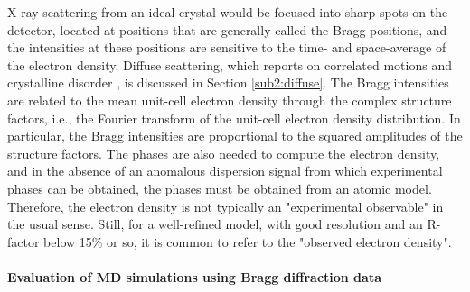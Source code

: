 \documentclass[9pt,review,pubversion]{livecoms}
\begin{document}
X-ray scattering from an ideal crystal would be focused into sharp spots on the detector, located at positions that are generally called the Bragg positions, and the intensities at these positions are sensitive to the time- and space-average of the electron density.
Diffuse scattering, which reports on correlated motions and crystalline disorder \cite{meisburger_x-ray_2017}, is discussed in Section \ref{sub2:diffuse}.
The Bragg intensities are related to the mean unit-cell electron density through the complex structure factors, i.e., the Fourier transform of the unit-cell electron density distribution.
In particular, the Bragg intensities are proportional to the squared amplitudes of the structure factors.
The phases are also needed to compute the electron density, and in the absence of an anomalous dispersion signal from which experimental phases can be obtained, the phases must be obtained from an atomic model.
Therefore, the electron density is not typically an "experimental observable" in the usual sense.
Still, for a well-refined model, with good resolution and an R-factor below 15\% or so, it is common to refer to the "observed electron density".

\paragraph{Evaluation of MD simulations using Bragg diffraction data}
\end{document}
